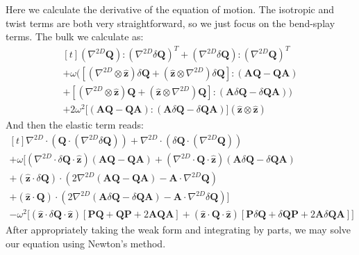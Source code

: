 \documentclass[reqno]{article}
\newcommand{\Q}{\mathbf{Q}}
\newcommand{\bP}{\mathbf{P}}
\newcommand{\A}{\mathbf{A}}
\newcommand{\z}{\mathbf{\hat{z}}}
\begin{document}
Here we calculate the derivative of the equation of motion.
The isotropic and twist terms are both very straightforward, so we just focus on the bend-splay terms.
The bulk we calculate as:
\begin{equation}
    \begin{multlined}[t]
        \left( \nabla^{2D} \Q \right) : \left( \nabla^{2D} \delta \Q \right)^T
        + \left( \nabla^{2D} \delta \Q \right): \left( \nabla^{2D} \Q \right)^T \\
        + \omega \biggl(
            \left[ \left( \nabla^{2D} \otimes \z \right) \delta \Q 
                + \left( \z \otimes \nabla^{2D} \right) \delta \Q
            \right] : \left( \A \Q - \Q \A \right) \\
            +
            \left[ \left( \nabla^{2D} \otimes \z \right) \Q 
                + \left( \z \otimes \nabla^{2D} \right) \Q
            \right] : \left( \A \delta \Q - \delta \Q \A \right) 
        \biggr) \\
        + 2 \omega^2 \bigl[ 
            \left( \A \Q - \Q \A \right) : \left( \A \delta \Q - \delta \Q \A \right) 
        \bigr] \left( \z \otimes \z \right)
    \end{multlined}
\end{equation}
And then the elastic term reads:
\begin{equation}
    \begin{multlined}[t]
        \nabla^{2D} \cdot \left( \Q \cdot \left( \nabla^{2D} \delta \Q \right) \right)
        + \nabla^{2D} \cdot \left( \delta \Q \cdot \left( \nabla^{2D} \Q \right) \right) \\
        + \omega \biggl[
            \left(\nabla^{2D} \cdot \delta \Q \cdot \z \right)
            \left(\A \Q - \Q \A \right)
            + \left(\nabla^{2D} \cdot \Q \cdot \z \right)
            \left(\A \delta \Q - \delta \Q \A \right) \\
            +
            \left( \z \cdot \delta \Q \right) \cdot \left( 
                2 \nabla^{2D} \left( \A \Q - \Q \A \right)
                - \A \cdot \nabla^{2D} \Q
            \right) \\
            +
            \left( \z \cdot \Q \right) \cdot \left( 
                2 \nabla^{2D} \left( \A \delta \Q - \delta \Q \A \right)
                - \A \cdot \nabla^{2D} \delta \Q
            \right)
        \biggr] \\
        -\omega^2 \bigl[
            \left( \z \cdot \delta \Q \cdot \z \right) \left[
                \bP \Q + \Q \bP + 2 \A \Q \A
            \right]
            +
            \left( \z \cdot \Q \cdot \z \right) \left[
                \bP \delta \Q + \delta \Q \bP + 2\A \delta \Q \A
            \right]
        \bigr]
    \end{multlined}
\end{equation}
After appropriately taking the weak form and integrating by parts, we may solve our equation using Newton's method.
\end{document}
